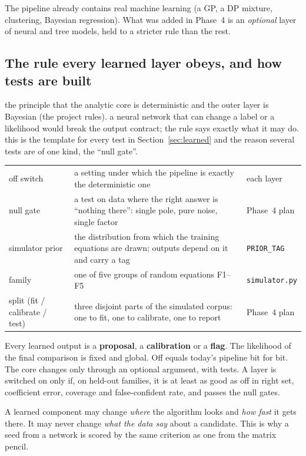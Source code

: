 \begin{takeaway}
The pipeline already contains real machine learning (a GP, a DP mixture, clustering, Bayesian regression). What was added in Phase~4 is an \emph{optional} layer of neural and tree models, held to a stricter rule than the rest.
\end{takeaway}

\subsection{The rule every learned layer obeys, and how tests are built}\label{sec:rule}
\sectionbrief
{the principle that the analytic core is deterministic and the outer layer is Bayesian (the project rules).}
{a neural network that can change a label or a likelihood would break the output contract; the rule says exactly what it may do.}
{this is the template for every test in Section~\ref{sec:learned} and the reason several tests are of one kind, the ``null gate''.}

\begin{symbols}
\begin{tabular}{@{}L{2.6cm}L{6.0cm}L{4.3cm}@{}}
off switch & a setting under which the pipeline is exactly the deterministic one & each layer\\
null gate & a test on data where the right answer is ``nothing there'': single pole, pure noise, single factor & Phase~4 plan\\
simulator prior & the distribution from which the training equations are drawn; outputs depend on it and carry a tag & \texttt{PRIOR\_TAG}\\
family & one of five groups of random equations F1--F5 & \texttt{simulator.py}\\
split (fit / calibrate / test) & three disjoint parts of the simulated corpus: one to fit, one to calibrate, one to report & Phase~4 plan\\
\end{tabular}
\end{symbols}

\begin{theorem}\label{thm:rule}
Every learned output is a \textbf{proposal}, a \textbf{calibration} or a \textbf{flag}. The likelihood of the final comparison is fixed and global. Off equals today's pipeline bit for bit. The core changes only through an optional argument, with tests. A layer is switched on only if, on held-out families, it is at least as good as off in right set, coefficient error, coverage and false-confident rate, and passes the null gates.
\end{theorem}
\begin{intuition}
A learned component may change \emph{where} the algorithm looks and \emph{how fast} it gets there. It may never change \emph{what the data say} about a candidate. This is why a seed from a network is scored by the same criterion as one from the matrix pencil.
\end{intuition}

